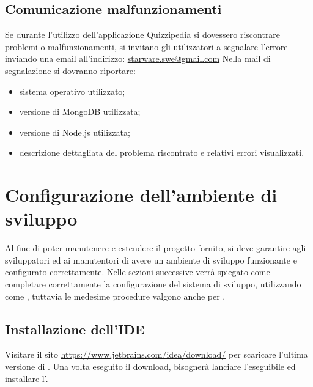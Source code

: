 \documentclass[12pt,a4paper]{article}
\begin{document}
	\subsection{Comunicazione malfunzionamenti}
		Se durante l’utilizzo dell’applicazione Quizzipedia si dovessero riscontrare problemi o
		malfunzionamenti, si invitano gli utilizzatori a segnalare l’errore inviando una email
		all’indirizzo:
		\url{starware.swe@gmail.com}
		Nella mail di segnalazione si dovranno riportare:
		\begin{itemize}
			\item sistema operativo utilizzato;
			\item versione di MongoDB utilizzata;
			\item versione di Node.js utilizzata;
			\item descrizione dettagliata del problema riscontrato e relativi errori visualizzati.
		\end{itemize}
	
	\newpage
	\section{Configurazione dell'ambiente di sviluppo}
	Al fine di poter manutenere e estendere il progetto fornito, si deve garantire agli sviluppatori ed ai manutentori di avere un ambiente di sviluppo funzionante e configurato correttamente.
	Nelle sezioni successive verrà spiegato come completare correttamente la configurazione del sistema di sviluppo, utilizzando come   , tuttavia le medesime procedure valgono anche per  .  
	
	\subsection{Installazione dell'IDE}
	Visitare il sito \url{https://www.jetbrains.com/idea/download/} per scaricare l'ultima versione di  .
	Una volta eseguito il download, bisognerà lanciare l'eseguibile ed installare l'.
	
\end{document}

